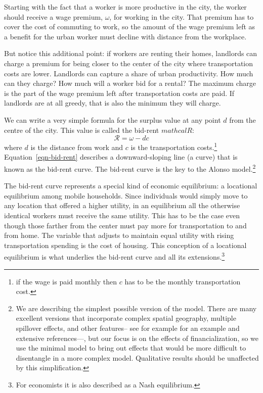 Starting with the fact that a worker is more productive in the city, the worker should receive a wage premium, $\omega$, for working in the city. That premium has to cover the cost of commuting to work, so the amount of the  wage premium left as a benefit for the urban worker must decline with distance from the workplace. 

But notice this additional point: if workers are renting their homes, landlords can charge a premium for being closer to the center of the city where transportation costs are lower.  Landlords can capture a share of urban productivity. How much can they charge? How much will a worker bid for a rental? The maximum charge is the part of the wage premium left after transportation costs are paid. If landlords are at all greedy, that is also the minimum they will charge. 

We can write a very simple formula for the surplus  value at any point $d$ from the centre of the city. This value is called the bid-rent  $mathcal{R}$: 
\begin{equation}  
\mathcal{R}= \omega - dc \label{eqn-bid-rent}\end{equation}
where $d$ is the distance from work and $c$ is the transportation costs.\footnote{ if the wage is paid monthly then $c$ has to be the monthly transportation cost.} Equation~\ref{eqn-bid-rent} describes a downward-sloping line (a curve) that is known as the bid-rent curve. The bid-rent curve is the key to the Alonso model.\footnote{We are describing the simplest possible version of the model. There are many excellent versions that incorporate complex spatial geography, multiple spillover effects, and other features-- see for example \cite{ahlfeldtECONOMICSDENSITYEVIDENCE2015} for an example and extensive references---, but our focus is on the effects of financialization, so we use the minimal model to bring out effects that would be more difficult to disentangle in a more complex model. Qualitative results should be unaffected by this simplification.}   

The \gls{bid-rent curve} represents a special  kind of economic equilibrium:   a locational equilibrium among mobile households. Since individuals would simply move to any location that offered a higher utility, in an equilibrium all the otherwise identical workers must receive the same utility. This has to be the case even though those farther from the center must pay more for transportation to and from home. The variable that  adjusts to maintain equal utility with rising transportation spending is the cost of housing. This conception of a \gls{locational equilibrium} is what underlies the bid-rent curve and all its extensions.\footnote{For economists it is also described as a Nash equilibrium.}


